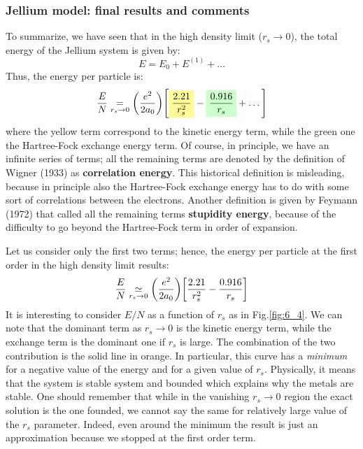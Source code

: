 \documentclass[../main/main.tex]{subfiles}
\begin{document}
\subsubsection{Jellium model: final results and comments}

To summarize, we have seen that in the high density limit (\( r_s \rightarrow 0 \)), the total energy of the Jellium system is given by:
\begin{equation*}
  E = E_0 + E^{(1)} + \dots
\end{equation*}
Thus, the energy per particle is:
\begin{equation*}
  \frac{E}{N}  \underset{r_s \rightarrow 0}{=} \qty(\frac{e^2}{2 a_0}) \qty[ \mathcolorbox{yellow!40}{\frac{2.21}{r_s^2}}- \mathcolorbox{green!20}{\frac{0.916}{r_s}}+\dots]
\end{equation*}
where the yellow term correspond to the kinetic energy term, while the green one the Hartree-Fock exchange energy term. Of course, in principle, we have an infinite series of terms; all the remaining terms are denoted by the definition of Wigner (1933) as   \textbf{correlation energy}. This historical definition is misleading, because in principle also the Hartree-Fock exchange energy has to do with some sort of correlations between the electrons. Another definition is given by Feymann (1972) that called all the remaining terms \textbf{stupidity energy}, because of the difficulty to go beyond the Hartree-Fock term in order of expansion.

Let us consider only the first two terms; hence, the energy per particle at the first order in the high density limit results:
\begin{equation*}
  \frac{E}{N} \underset{r_s \rightarrow 0}{\simeq }
  \qty(\frac{e^2}{2 a_0}) \qty[ \frac{2.21}{r_s^2}- \frac{0.916}{r_s}]
\end{equation*}
It is interesting to consider \( E/N \) as a function of \( r_s \) as in Fig.\ref{fig:6_4}. We can note that the dominant term as \( r_s \rightarrow 0\) is the kinetic energy term, while the exchange term is the dominant  one if \( r_s \) is large. The combination of the two contribution is the solid line in orange. In particular, this curve has a \emph{minimum} for a negative value of the energy and for a given value of \( r_s \). Physically, it means that the system is stable system and bounded which explains why the metals are stable. One should remember that while in the vanishing \( r_s \rightarrow 0 \) region the exact solution is the one founded, we cannot say the same for relatively large value of the \( r_s \) parameter. Indeed, even around the minimum the result is just an approximation because we stopped at the first order term.
\end{document}
